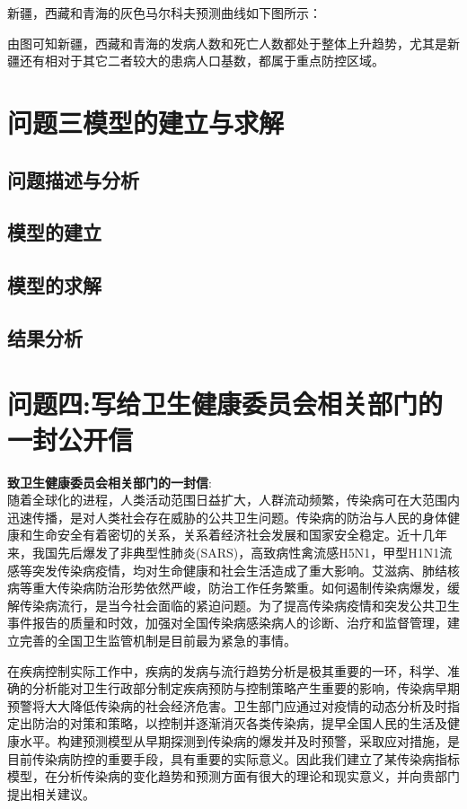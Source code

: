 \documentclass{whutmod}
\begin{document}
 
    新疆，西藏和青海的灰色马尔科夫预测曲线如下图所示：
    
    由图可知新疆，西藏和青海的发病人数和死亡人数都处于整体上升趋势，尤其是新疆还有相对于其它二者较大的患病人口基数，都属于重点防控区域。

     	\section{问题三模型的建立与求解}
     \subsection{问题描述与分析}
    
     
     
     \subsection{模型的建立}
     
     
     
     
     \subsection{模型的求解}   
     
     
     \subsection{结果分析}
     
     
    \section{问题四:写给卫生健康委员会相关部门的一封公开信}
    \textbf{致卫生健康委员会相关部门的一封信}:
    ~\\
    
    随着全球化的进程，人类活动范围日益扩大，人群流动频繁，传染病可在大范围内迅速传播，是对人类社会存在威胁的公共卫生问题。传染病的防治与人民的身体健康和生命安全有着密切的关系，关系着经济社会发展和国家安全稳定。近十几年来，我国先后爆发了非典型性肺炎(SARS)，高致病性禽流感H5N1，甲型H1N1流感等突发传染病疫情，均对生命健康和社会生活造成了重大影响。艾滋病、肺结核病等重大传染病防治形势依然严峻，防治工作任务繁重。如何遏制传染病爆发，缓解传染病流行，是当今社会面临的紧迫问题。为了提高传染病疫情和突发公共卫生事件报告的质量和时效，加强对全国传染病感染病人的诊断、治疗和监督管理，建立完善的全国卫生监管机制是目前最为紧急的事情。
    
    在疾病控制实际工作中，疾病的发病与流行趋势分析是极其重要的一环，科学、准确的分析能对卫生行政部分制定疾病预防与控制策略产生重要的影响，传染病早期预警将大大降低传染病的社会经济危害。卫生部门应通过对疫情的动态分析及时指定出防治的对策和策略，以控制并逐渐消灭各类传染病，提早全国人民的生活及健康水平。构建预测模型从早期探测到传染病的爆发并及时预警，采取应对措施，是目前传染病防控的重要手段，具有重要的实际意义。因此我们建立了某传染病指标模型，在分析传染病的变化趋势和预测方面有很大的理论和现实意义，并向贵部门提出相关建议。
    
\end{document}
